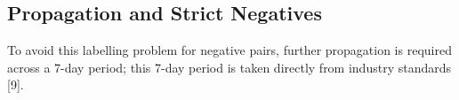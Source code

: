 \documentclass[letterpaper,11pt,leqno]{article}
\begin{document}
\subsection{Propagation and Strict Negatives}

To avoid this labelling problem for negative pairs, further propagation is required across a 7-day period; this 7-day period is taken directly from industry standards [9].







\end{document}
